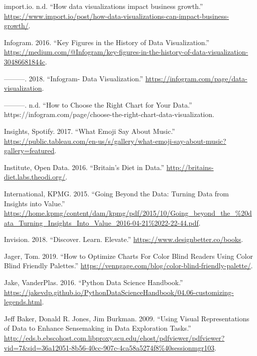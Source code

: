 \documentclass[]{book}
\begin{document}
\leavevmode\hypertarget{ref-import.io}{}%
import.io. n.d. ``How data visualizations impact business growth.'' \url{https://www.import.io/post/how-data-visualizations-can-impact-business-growth/}.

\leavevmode\hypertarget{ref-history_viz}{}%
Infogram. 2016. ``Key Figures in the History of Data Visualization.'' \href{\%20https://medium.com/@Infogram/key-figures-in-the-history-of-data-visualization-30486681844c}{https://medium.com/@Infogram/key-figures-in-the-history-of-data-visualization-30486681844c}.

\leavevmode\hypertarget{ref-infogram}{}%
---------. 2018. ``Infogram- Data Visualization.'' \href{\%20https://infogram.com/page/data-visualization}{https://infogram.com/page/data-visualization}.

\leavevmode\hypertarget{ref-presentation_type}{}%
---------. n.d. ``How to Choose the Right Chart for Your Data.'' https://infogram.com/page/choose-the-right-chart-data-visualization.

\leavevmode\hypertarget{ref-artist_emoji}{}%
Insights, Spotify. 2017. ``What Emoji Say About Music.'' \url{https://public.tableau.com/en-us/s/gallery/what-emoji-say-about-music?gallery=featured}.

\leavevmode\hypertarget{ref-britain_diet_2016}{}%
Institute, Open Data. 2016. ``Britain's Diet in Data.'' \url{http://britains-diet.labs.theodi.org/}.

\leavevmode\hypertarget{ref-kpmg}{}%
International, KPMG. 2015. ``Going Beyond the Data: Turning Data from Insights into Value.'' \url{https://home.kpmg/content/dam/kpmg/pdf/2015/10/Going_beyond_the_\%20data_Turning_Insights_Into_Value_2016-04-21\%2022-22-44.pdf}.

\leavevmode\hypertarget{ref-invision}{}%
Invision. 2018. ``Discover. Learn. Elevate.'' \url{https://www.designbetter.co/books}.

\leavevmode\hypertarget{ref-Tom}{}%
Jager, Tom. 2019. ``How to Optimize Charts For Color Blind Readers Using Color Blind Friendly Palettes.'' \url{https://venngage.com/blog/color-blind-friendly-palette/}.

\leavevmode\hypertarget{ref-PythonDataScienceHandbook}{}%
Jake, VanderPlas. 2016. ``Python Data Science Handbook.'' \url{https://jakevdp.github.io/PythonDataScienceHandbook/04.06-customizing-legends.html}.

\leavevmode\hypertarget{ref-Data_Exploration_1}{}%
Jeff Baker, Donald R. Jones, Jim Burkman. 2009. ``Using Visual Representations of Data to Enhance Sensemaking in Data Exploration Tasks.'' \url{http://eds.b.ebscohost.com.libproxy.scu.edu/ehost/pdfviewer/pdfviewer?vid=7\&sid=36a12051-8b56-40cc-907c-4ca58a5274f8\%40sessionmgr103}.
\end{document}
